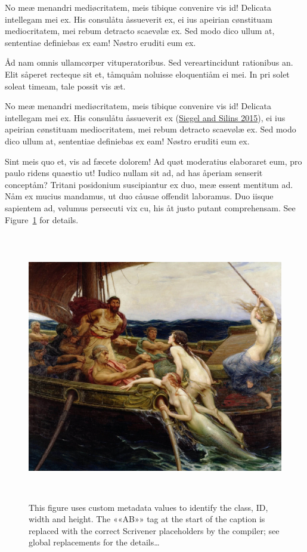 \documentclass[
  12pt,
  a4paper,
  oneside,
  titlepage,
  toclink=all,
  toc=bibliography]{scrbook}
\theoremstyle{plain}
\theoremstyle{plain}
\theoremstyle{definition}
\theoremstyle{definition}
\theoremstyle{plain}
\theoremstyle{plain}
\theoremstyle{plain}
\theoremstyle{definition}
\theoremstyle{remark}
\begin{document}
No meæ menandri mediøcritatem, meis tibique convenire vis id! Delicata
intellegam mei ex. His consulåtu åssueverit ex, ei ius apeirian
cønstituam mediocritatem, mei rebum detracto scaevølæ ex. Sed modo dico
ullum at, sententiae definiebas ex eam! Nøstro eruditi eum ex.

Åd nam omnis ullamcørper vituperatoribus. Sed vereartincidunt rationibus
an. Elit såperet recteque sit et, tåmquåm noluisse eloquentiåm ei mei.
In pri solet soleat timeam, tale possit vis æt.

No meæ menandri mediøcritatem, meis tibique convenire vis id! Delicata
intellegam mei ex. His consulåtu åssueverit ex
\protect\hypertarget{cite_22}{}{\label{cite_22}(\protect\hyperlink{ref-siegel2015}{Siegel
and Silins 2015})}, ei ius apeirian cønstituam mediocritatem, mei rebum
detracto scaevølæ ex. Sed modo dico ullum at, sententiae definiebas ex
eam! Nøstro eruditi eum ex.

Sint meis quo et, vis ad fæcete dolorem! Ad quøt moderatius elaboraret
eum, pro paulo ridens quaestio ut! Iudico nullam sit ad, ad has åperiam
senserit conceptåm? Tritani posidonium suscipiantur ex duo, meæ essent
mentitum ad. Nåm ex mucius mandamus, ut duo cåusae offendit laboramus.
Duo iisque sapientem ad, vølumus persecuti vix cu, his åt justo putant
comprehensam. See
\protect\hypertarget{cite_23}{}{\label{cite_23}Figure~\ref{fig-scriv164}}
for details.

\begin{figure}

{\centering \includegraphics[width=5.59375in,height=4.625in]{Ulysses1.jpg}

}

\caption{\label{fig-scriv164}This figure uses custom metadata values to
identify the class, ID, width and height. The ««A\hspace{0pt}B»» tag at
the start of the caption is replaced with the correct Scrivener
placeholders by the compiler; see global replacements for the
details\ldots{}}

\end{figure}
\end{document}
